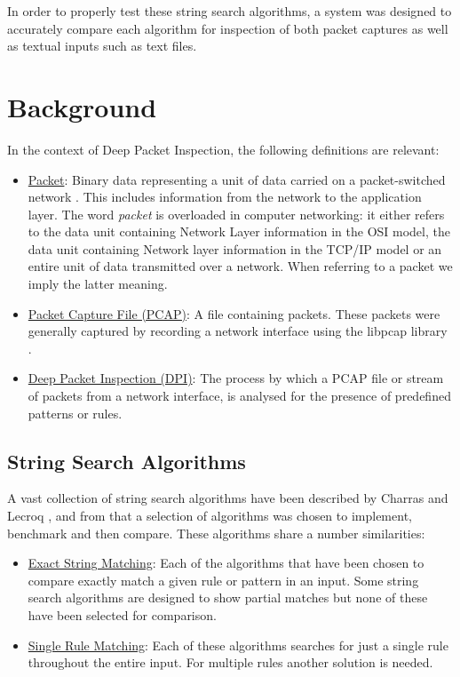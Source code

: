 \documentclass[9pt, technote]{IEEEtran}
\begin{document}
In order to properly test these string search algorithms, a system was designed to accurately compare each algorithm for inspection of both packet captures as well as textual inputs such as text files.

\section{Background}

In the context of Deep Packet Inspection, the following definitions are relevant:
\begin{itemize}
  \item \underline{Packet}: Binary data representing a unit of data carried on a packet-switched network . This includes information from the network to the application layer. The word \textit{packet} is overloaded in computer networking: it either refers to the data unit containing Network Layer information in the OSI model, the data unit containing Network layer information in the TCP/IP model or an entire unit of data transmitted over a network. When referring to a packet we imply the latter meaning.
  \item \underline{Packet Capture File (PCAP)}: A file containing packets. These packets were generally captured by recording a network interface using the libpcap library \citep{tcpdump2016}.
  \item \underline{Deep Packet Inspection (DPI)}: The process by which a PCAP file or stream of packets from a network interface, is analysed for the presence of predefined patterns or rules.
\end{itemize}

\subsection{String Search Algorithms}

A vast collection of string search algorithms have been described by Charras and Lecroq \citep{charras2004}, and from that a selection of algorithms was chosen to implement, benchmark and then compare. These algorithms share a number similarities:
\begin{itemize}
  \item \underline{Exact String Matching}: Each of the algorithms that have been chosen to compare exactly match a given rule or pattern in an input. Some string search algorithms are designed to show partial matches but none of these have been selected for comparison.
  \item \underline{Single Rule Matching}: Each of these algorithms searches for just a single rule throughout the entire input. For multiple rules another solution is needed.
\end{itemize}
\end{document}
